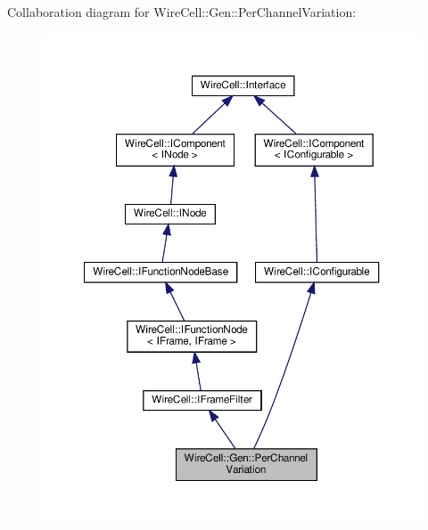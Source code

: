 Collaboration diagram for Wire\+Cell\+:\+:Gen\+:\+:Per\+Channel\+Variation\+:
\nopagebreak
\begin{figure}[H]
\begin{center}
\leavevmode
\includegraphics[width=350pt]{class_wire_cell_1_1_gen_1_1_per_channel_variation__coll__graph}
\end{center}
\end{figure}
